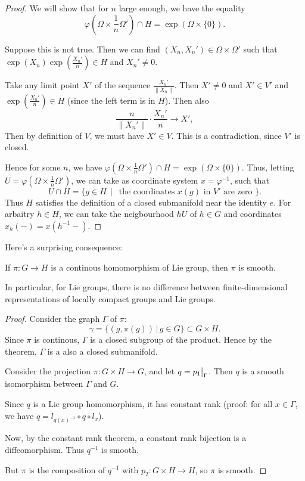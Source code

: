 \documentclass[11pt, english]{article}
\begin{document}
\begin{proof}
We will show that for $n$ large enough, we have the equality
$$
\varphi \left(\Omega \times \frac 1n \Omega' \right) \cap H  = \exp(\Omega \times \{0\} ).
$$

Suppose this is not true. Then we can find $(X_n,X_n') \in \Omega \times \Omega'$ such that $\exp(X_n) \exp(\frac{X_n'}{n}) \in H$ and $X_n' \neq 0$. 

Take any limit point $X'$ of the sequence $\frac{X_n'}{\| X_n \| }$. Then $X' \neq 0$ and $X' \in V'$ and $\exp(\frac{X_n'}{n}) \in H$ (since the left term is in $H$). Then also
$$
\frac{n}{\| X_n' \|} \cdot \frac{X_n'}{n} \to X',
$$
Then by definition of $V$, we must have $X' \in V$. This is a contradiction, since $V'$ is closed. 

Hence for some $n$, we have $\varphi \left (\Omega \times \frac 1n \Omega' \right) \cap H = \exp(\Omega \times \{0\})$. Thus, letting $U= \varphi \left(\Omega \times \frac 1n \Omega'\right)$, we can take as coordinate system $x=\varphi^{-1}$, such that
$$
U \cap H = \{ g \in H \, \mid \, \text{ the coordinates $x(g)$ in $V'$ are zero } \}.
$$
Thus $H$ satisfies the definition of a closed submanifold near the identity $e$. For arbaitry $h \in H$, we can take the neigbourhood $hU$ of $h \in G$ and coordinates $x_h(-) = x(h^{-1}-)$.
\end{proof}

Here's a surprising consequence:

\begin{thm}
If $\pi:G \to H$ is a continous homomorphism of Lie group, then $\pi$ is smooth.
\end{thm}

In particular, for Lie groups, there is no difference between finite-dimensional representations of locally compact groups and Lie groups. 

\begin{proof}
  Consider the graph $\Gamma$ of $\pi$:
$$
\gamma = \{ (g,\pi(g) ) \, | \, g \in G \} \subset G \times H.
$$
Since $\pi$ is continous, $\Gamma$ is a closed subgroup of the product. Hence by the theorem, $\Gamma$ is a also a closed submanifold.

Consider the projection $\pi:G \times H \to G$, and let $q = \restr{p_1}{\Gamma}$. Then $q$ is a smooth isomorphism between $\Gamma$ and $G$. 

Since $q$ is a Lie group homomorphism, it has constant rank (proof: for all $x \in \Gamma$, we have $q=l_{q(x)^{-1}} \circ q \circ l_x$). 

Now, by the constant rank theorem, a constant rank bijection is a diffeomorphism. Thus $q^{-1}$ is smooth.

But $\pi$ is the composition of $q^{-1}$ with $p_2:G \times H \to H$, so $\pi$ is smooth.
\end{proof}
\end{document}
